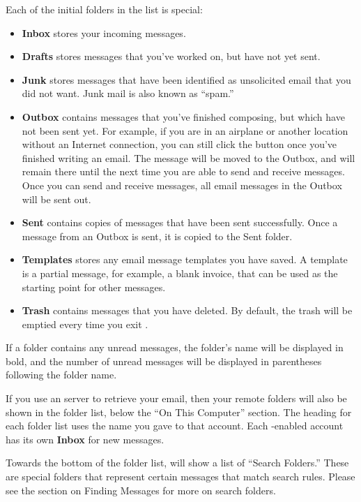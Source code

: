 Each of the initial folders in the list is special:
\begin{itemize}
  \item \textbf{Inbox} stores your incoming messages.
  \item \textbf{Drafts} stores messages that you've worked on, but have not 
yet sent.
  \item \textbf{Junk} stores messages that have been identified as unsolicited
email that you did not want. Junk mail is also known as ``spam.''
  \item \textbf{Outbox} contains messages that you've finished composing, but 
which have not been sent yet. For example, if you are in an airplane or another
location without an Internet connection, you can still click the 
button once you've finished writing an email. The message will be moved
to the Outbox, and will remain there until the next time you are able to
send and receive messages. Once you can send and receive messages, all email
messages in the Outbox will be sent out.
  \item \textbf{Sent} contains copies of messages that have been sent successfully.
Once a message from an Outbox is sent, it is copied to the Sent folder.
  \item \textbf{Templates} stores any email message templates you have saved.
A template is a partial message, for example, a blank invoice, that can be used
as the starting point for other messages.
  \item \textbf{Trash} contains messages that you have deleted. By default,
    the trash will be emptied every time you exit .
\end{itemize}

If a folder contains any unread messages, the folder's name will be displayed
in bold, and the number of unread messages will be displayed in parentheses
following the folder name.

If you use an  server to retrieve your email, then your remote  folders
will also be shown in the folder list, below the ``On This Computer'' section.
The heading for each folder list uses the name you gave to that account.
Each -enabled account has its own \textbf{Inbox} for new messages.

Towards the bottom of the folder list,  will show a list of
``Search Folders.'' These are special folders that represent certain
messages that match search rules. Please see the section on Finding Messages
for more on search folders.

